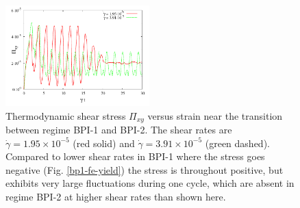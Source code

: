 \documentclass[8.5pt,twoside,twocolumn]{article}
\newcommand{\e}[1]{\times10^{#1}}
\newcommand{\gd}{\dot{\gamma}}
\begin{document}
\begin{figure}[htpb]
\includegraphics[width=0.495\textwidth]{stress_bp1-1_bp1-2.pdf}
\caption{Thermodynamic shear stress $\Pi_{xy}$ versus strain near the 
transition between regime BPI-1 and BPI-2. 
The shear rates are $\gd=1.95\e{-5}$ (red solid) 
and $\gd=3.91\e{-5}$ (green dashed). Compared to lower shear rates in BPI-1 
where the stress goes negative (Fig. \ref{bp1-fe-yield}) the stress is 
throughout positive, but exhibits very large fluctuations during one cycle, 
which are absent in regime BPI-2 at higher shear rates than shown here.}
\label{bp1-1_bp1-2}
\end{figure}
\end{document}
